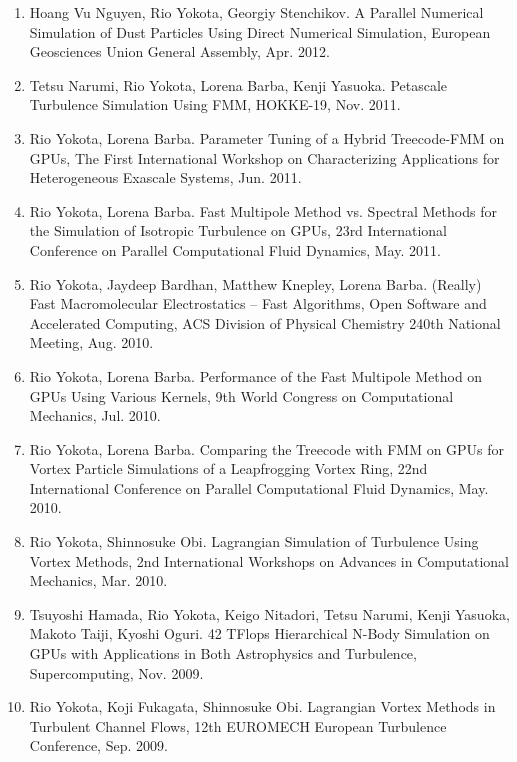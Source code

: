 \documentclass[margin,line]{cv}
\begin{document}
\begin{resume}
\begin{enumerate}
\item Hoang Vu Nguyen, Rio Yokota, Georgiy Stenchikov. A Parallel Numerical Simulation of Dust Particles Using Direct Numerical Simulation, European Geosciences Union General Assembly, Apr. 2012.

\item Tetsu Narumi, Rio Yokota, Lorena Barba, Kenji Yasuoka. Petascale Turbulence Simulation Using FMM, HOKKE-19, Nov. 2011.

\item Rio Yokota, Lorena Barba. Parameter Tuning of a Hybrid Treecode-FMM on GPUs, The First International Workshop on Characterizing Applications for Heterogeneous Exascale Systems, Jun. 2011.

\item Rio Yokota, Lorena Barba. Fast Multipole Method vs. Spectral Methods for the Simulation of Isotropic Turbulence on GPUs, 23rd International Conference on Parallel Computational Fluid Dynamics, May. 2011.

\item Rio Yokota, Jaydeep Bardhan, Matthew Knepley, Lorena Barba. (Really) Fast Macromolecular Electrostatics -- Fast Algorithms, Open Software and Accelerated Computing, ACS Division of Physical Chemistry 240th National Meeting, Aug. 2010.

\item Rio Yokota, Lorena Barba. Performance of the Fast Multipole Method on GPUs Using Various Kernels, 9th World Congress on Computational Mechanics, Jul. 2010.

\item Rio Yokota, Lorena Barba. Comparing the Treecode with FMM on GPUs for Vortex Particle Simulations of a Leapfrogging Vortex Ring, 22nd International Conference on Parallel Computational Fluid Dynamics, May. 2010.

\item Rio Yokota, Shinnosuke Obi. Lagrangian Simulation of Turbulence Using Vortex Methods, 2nd International Workshops on Advances in Computational Mechanics, Mar. 2010.

\item Tsuyoshi Hamada, Rio Yokota, Keigo Nitadori, Tetsu Narumi, Kenji Yasuoka, Makoto Taiji, Kyoshi Oguri. 42 TFlops Hierarchical N-Body Simulation on GPUs with Applications in Both Astrophysics and Turbulence, Supercomputing, Nov. 2009.

\item Rio Yokota, Koji Fukagata, Shinnosuke Obi. Lagrangian Vortex Methods in Turbulent Channel Flows, 12th EUROMECH European Turbulence Conference, Sep. 2009.


\end{enumerate}
\end{resume}
\end{document}
